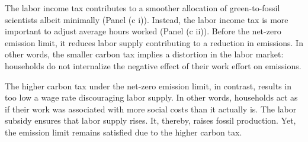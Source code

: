 The labor income tax contributes to a smoother allocation of green-to-fossil scientists albeit minimally (Panel (c i)). 
Instead, the labor income tax is more important to adjust average hours worked (Panel (c ii)). Before the net-zero emission limit, it reduces labor supply contributing to a reduction in emissions. In other words, the smaller carbon tax implies a distortion in the labor market: households do not internalize the negative effect of their work effort on emissions. 

The higher carbon tax under the net-zero emission limit, in contrast, results in too low a wage rate discouraging labor supply. In other words, households act as if their work was associated with more social costs than it actually is. The labor subsidy ensures that labor supply rises. It, thereby, raises fossil production. Yet, the emission limit remains satisfied due to the higher carbon tax. %

